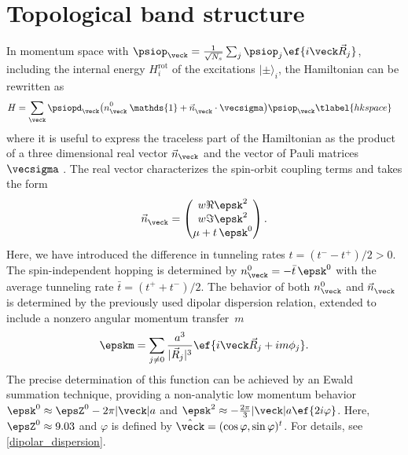 \section{Topological band structure}
In momentum space with $\psiop_{\veck}=\frac{1}{\sqrt{N_s}}\sum_{j} \psiop_{j}\ef{i\veck\vec{R}_j}$, including the internal energy $H_{i}^{\text{rot}}$ of the excitations $|\pm\rangle_{i}$, the Hamiltonian  can be rewritten as
\begin{align}
    H &= \sum_{\veck} \psiopd_{\veck} \big({n^{0\vphantom\dagger}_{\veck} \: \mathds{1} + \vec{n}^{\vphantom \dagger}_{\veck}\cdot\vecsigma}\big) \psiop_{\veck}
    \tlabel{hkspace}
\end{align}
where it is useful to express the traceless part of the Hamiltonian
as the product of a three dimensional real vector $\vec{n}_{\veck}$ and the vector of Pauli matrices $\vecsigma$ \cite{Hasan2010,Bernevig2013}.
The real vector characterizes the spin-orbit coupling terms and takes the form
\begin{align}
    \vec{n}^{\vphantom 0}_{\veck} = \begin{pmatrix}
        w \Re \epsk^2 \\
        w \Im \epsk^2 \\
        \mu + t\, \epsk^0
    \end{pmatrix}.
\end{align}
Here, we have introduced the difference in tunneling rates $t = (t^--t^+)/2 > 0$.
The spin-independent hopping is determined by $n^0_{\veck} = -\bar{t}\, \epsk^0$ with the average tunneling rate ${\bar t} = (t^{+}+t^{-})/2$.
The behavior of both $n^0_\veck$ and $\vec{n}^{\vphantom 0}_\veck$ is determined by the previously used dipolar dispersion relation, extended to include a nonzero angular momentum transfer~$m$~\cite{Muller2010,Peter2012b,Syzranov2014,Peter2014}
\begin{align}
    \epskm = \sum_{j\ne 0} \frac{a^3}{|\vec{R}_j|^3}\ef{i\veck \vec{R}_j + i m \phi_{j}}.
\end{align}
The precise determination of this function can be achieved by an Ewald summation technique, providing a non-analytic low momentum behavior
$\epsk^0 \approx \epsZ^0 - 2\pi |\veck|a$ and
$\epsk^2 \approx -\frac{2\pi}{3} |\veck|a \ef{2i \varphi}$.
Here, $\epsZ^0 \approx 9.03$ and $\varphi$ is defined by $\hat{\veck}=(\cos \varphi, \sin \varphi)^t$.
For details, see \cref{dipolar_dispersion}.

